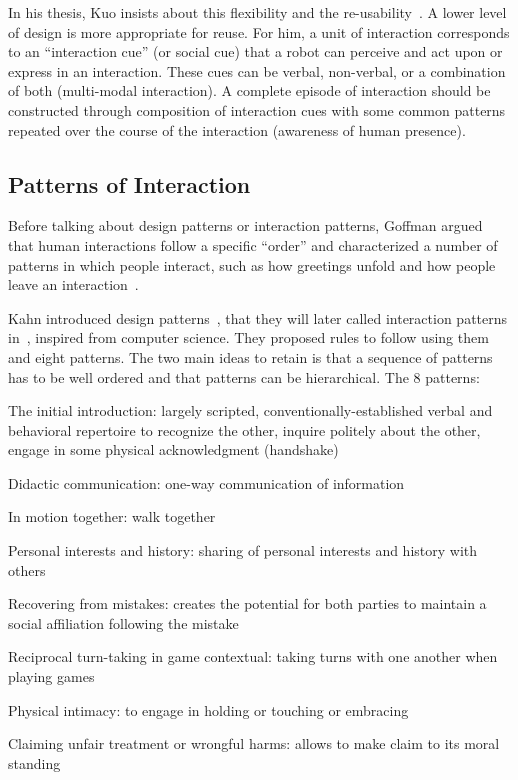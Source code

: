 \documentclass[a4paper,11pt,twoside]{StyleThese}
\begin{document}
In his thesis, Kuo insists about this flexibility and the re-usability~\cite{kuo_2012_designing}. A lower level of design is more appropriate for reuse. For him, a unit of interaction corresponds to an ``interaction cue'' (or social cue) that a robot can perceive and act upon or express in an interaction. These cues can be verbal, non-verbal, or a combination of both (multi-modal interaction). A complete episode of interaction should be constructed through composition of interaction cues with some common patterns repeated over the course of the interaction (\eg awareness of human presence).

\subsection{Patterns of Interaction}\label{chap2:subsec:inter_patt}
Before talking about design patterns or interaction patterns, Goffman argued that human interactions follow a specific ``order'' and characterized a number of patterns in which people interact, such as how greetings unfold and how people leave an interaction~\cite{goffman_1983_interaction}.

Kahn \etal{} introduced design patterns~\cite{kahn_2008_design}, that they will later called interaction patterns in~\cite{kahn_2010_validating}, inspired from computer science. They proposed rules to follow using them and eight patterns. The two main ideas to retain is that a sequence of patterns has to be well ordered and that patterns can be hierarchical. 
The 8 patterns: 
\begin{bulletList}
	\item The initial introduction: largely scripted, conventionally-established verbal and behavioral repertoire to recognize the other, inquire politely about the other, engage in some physical acknowledgment (\eg handshake)
	\item Didactic communication: one-way communication of information 
	\item In motion together: walk together
	\item Personal interests and history: sharing of personal interests and history with others
	\item Recovering from mistakes: creates the potential for both parties to maintain a social affiliation following the mistake
	\item Reciprocal turn-taking in game contextual: taking turns with one another when playing games
	\item Physical intimacy: to engage in holding or touching or embracing
	\item Claiming unfair treatment or wrongful harms: allows to make claim to its moral standing
\end{bulletList}
\end{document}

